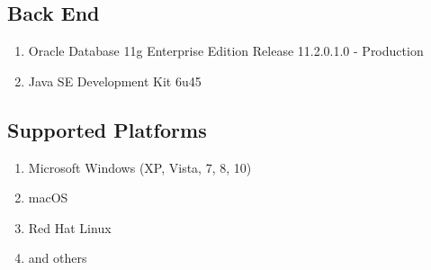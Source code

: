 \documentclass[12pt]{report} %
\begin{document}
\subsection{Back End}
\renewcommand{\labelenumi}{\alph{enumi})}
\begin{enumerate}
  \item Oracle Database 11g Enterprise Edition Release 11.2.0.1.0 - Production
  \item Java SE Development Kit 6u45
\end{enumerate}


\subsection{Supported Platforms}
\renewcommand{\labelenumi}{\alph{enumi})}
\begin{enumerate}
		\item Microsoft Windows (XP, Vista, 7, 8, 10)
		\item macOS
		\item Red Hat Linux
		\item and others
\end{enumerate}

%
\end{document}
